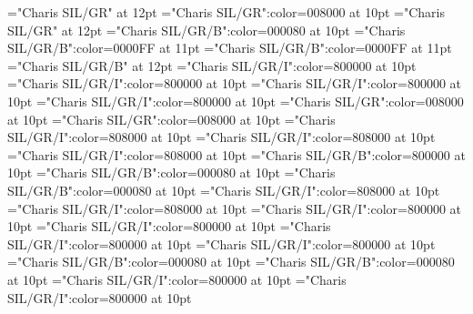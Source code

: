 \documentclass[a4paper,twoside]{article}
\begin{document}
\pagestyle{plain}
\sloppy
\setlength{\parfillskip}{0pt plus 1fil}
\font\dives="Charis SIL/GR" at 12pt
\font\spanes="Charis SIL/GR":color=008000 at 10pt
\font\divmxb="Charis SIL/GR" at 12pt
\font\spanmxb="Charis SIL/GR/B":color=000080 at 10pt
\font\spanmxbmainheadwordentry="Charis SIL/GR/B":color=0000FF at 11pt
\font\spanmainheadwordentry="Charis SIL/GR/B":color=0000FF at 11pt
\font\sensenumbersensecontentsensesentry="Charis SIL/GR/B" at 12pt
\font\spanespartofspeechmorphosyntaxanalysissharedgrammaticalinfosensesentry="Charis SIL/GR/I":color=800000 at 10pt
\font\spanpartofspeechmorphosyntaxanalysissharedgrammaticalinfosensesentry="Charis SIL/GR/I":color=800000 at 10pt
\font\spanespartofspeechmorphosyntaxanalysissensesensecontentsensesentry="Charis SIL/GR/I":color=800000 at 10pt
\font\spanpartofspeechmorphosyntaxanalysissensesensecontentsensesentry="Charis SIL/GR/I":color=800000 at 10pt
\font\spanesdefinitionsensesensecontentsensesentry="Charis SIL/GR":color=008000 at 10pt
\font\spandefinitionsensesensecontentsensesentry="Charis SIL/GR":color=008000 at 10pt
\font\comentariorestrictivosensesensecontentsensesentry="Charis SIL/GR/I":color=808000 at 10pt
\font{}="Charis SIL/GR/I":color=808000 at 10pt
\font\scientificnamesensesensecontentsensesentry="Charis SIL/GR/I":color=808000 at 10pt
\font\sensenumbersensecontentsensessensesensecontentsensesentry="Charis SIL/GR/B":color=800000 at 10pt
\font\spanmxbexampleexamplescontentssensesensecontentsensesentry="Charis SIL/GR/B":color=000080 at 10pt
\font\spanexampleexamplescontentssensesensecontentsensesentry="Charis SIL/GR/B":color=000080 at 10pt
\font\spanesencyclopedicinfosensesensecontentsensesentry="Charis SIL/GR/I":color=808000 at 10pt
\font\spanencyclopedicinfosensesensecontentsensesentry="Charis SIL/GR/I":color=808000 at 10pt
\font\spanescommententry="Charis SIL/GR/I":color=800000 at 10pt
\font\spancommententry="Charis SIL/GR/I":color=800000 at 10pt
\font\spanesabbreviationvariantentrytypevariantentrytypesvariantformentrybackrefsentry="Charis SIL/GR/I":color=800000 at 10pt
\font\spanabbreviationvariantentrytypevariantentrytypesvariantformentrybackrefsentry="Charis SIL/GR/I":color=800000 at 10pt
\font\spanmxbheadwordvariantformentrybackrefvariantformentrybackrefsentry="Charis SIL/GR/B":color=000080 at 10pt
\font\spanheadwordvariantformentrybackrefvariantformentrybackrefsentry="Charis SIL/GR/B":color=000080 at 10pt
\font\spanesabbreviationvariantentrytypevariantentrytypesvariantformentrybackrefsbentry="Charis SIL/GR/I":color=800000 at 10pt
\font\spanabbreviationvariantentrytypevariantentrytypesvariantformentrybackrefsbentry="Charis SIL/GR/I":color=800000 at 10pt
\end{document}
